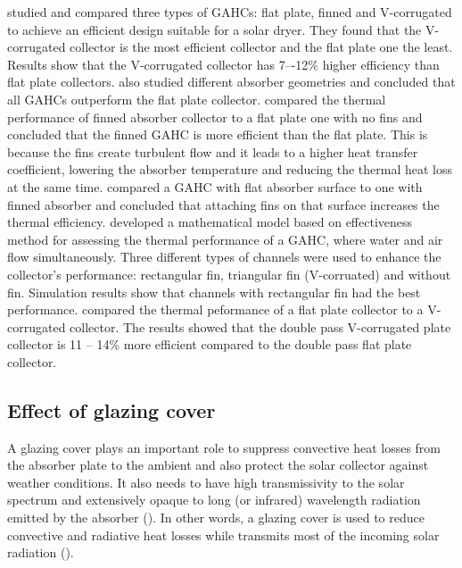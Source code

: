 
\citet{Karim2004} studied and compared three types of GAHCs: flat plate, finned and V-corrugated to achieve an efficient design suitable for a solar dryer. They found that the V-corrugated collector is the most efficient collector and the flat plate one the least. Results show that the V-corrugated collector has 7–-12\% higher efficiency than flat plate collectors. \citet{Kurtbas2004} also studied different absorber geometries and concluded that all GAHCs outperform the flat plate collector. \citet{Karsli2007} compared the thermal performance of finned absorber collector to a flat plate one with no fins and concluded that the finned GAHC is more efficient than the flat plate. This is because the fins create turbulent flow and it leads to a higher heat transfer coefficient, lowering the absorber temperature and reducing the thermal heat loss at the same time. \citet{Alta2010} compared a GAHC with flat absorber surface to one with finned absorber and concluded that attaching fins on that surface increases the thermal efficiency. \citet{Assari2011} developed a mathematical model based on effectiveness method for assessing the thermal performance of a GAHC, where water and air flow simultaneously. Three different types of channels were used to enhance the collector's performance: rectangular fin, triangular fin (V-corruated) and without fin. Simulation results show that channels with rectangular fin had the best performance. \citet{ElSebaii2011} compared the thermal peformance of a flat plate collector to a V-corrugated collector. The results showed that the double pass
V-corrugated plate collector is 11 -- 14\% more efficient compared to the double pass flat plate collector.

\subsection{Effect of glazing cover} 

A glazing cover plays an important role to suppress convective heat losses from the absorber plate to the ambient and also protect the solar collector against weather conditions. It also needs to have high transmissivity to the solar spectrum and extensively opaque to long (or infrared) wavelength radiation emitted by the absorber (\cite{Saxena2015a}). In other words, a glazing cover is used to reduce convective and radiative heat losses while transmits most of the incoming solar radiation (\cite{Norton2006}).

